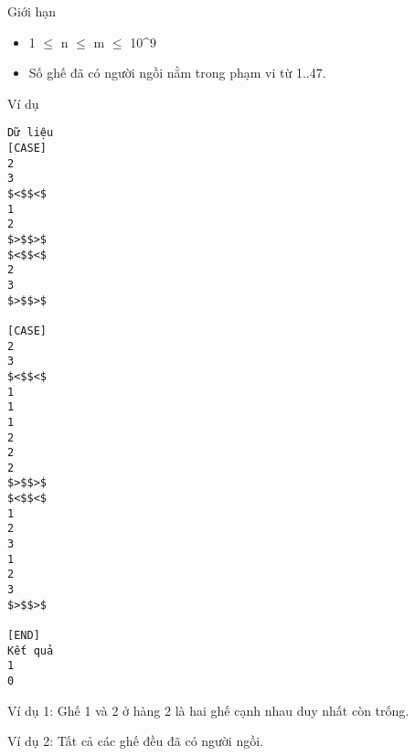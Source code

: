Giới hạn
\begin{itemize}
	\item     1  $\le$  n  $\le$  m  $\le$  10^9   
	\item     Số ghế đã có người ngồi nằm trong phạm vi từ 1..47.   
\end{itemize}
Ví dụ
\begin{verbatim}
Dữ liệu
[CASE]
2
3
$<$$<$
1
2
$>$$>$
$<$$<$
2
3
$>$$>$

[CASE]
2
3
$<$$<$
1
1
1
2
2
2
$>$$>$
$<$$<$
1
2
3
1
2
3
$>$$>$

[END]
Kết quả
1
0
\end{verbatim}

   Ví dụ 1: Ghế 1 và 2 ở hàng 2 là hai ghế cạnh nhau duy nhất còn trống.  

   Ví dụ 2: Tất cả các ghế đều đã có người ngồi.
